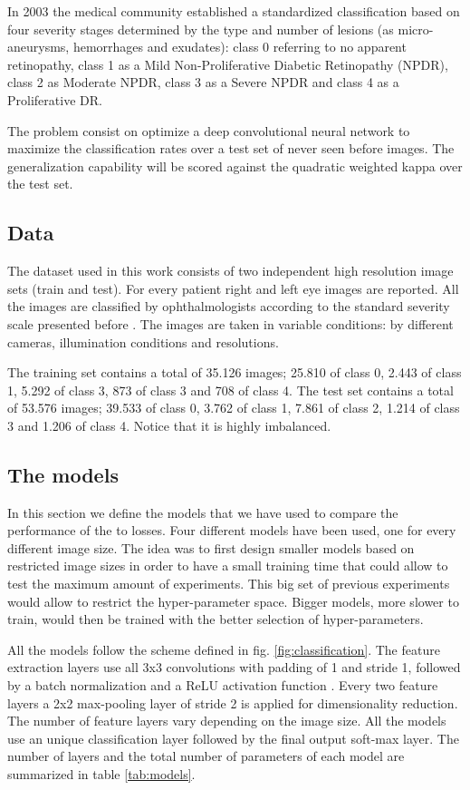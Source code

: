 \documentclass[times,twocolumn,final,authoryear]{elsarticle}
\begin{document}
In 2003 the medical community established a standardized classification based on four severity stages \cite{diaclass} determined by the type and number of lesions (as micro-aneurysms, hemorrhages and exudates): class 0 referring to no apparent retinopathy, class 1 as a Mild Non-Proliferative Diabetic Retinopathy (NPDR), class 2 as Moderate NPDR, class 3 as a Severe NPDR and class 4 as a Proliferative DR. 

The problem consist on optimize a deep convolutional neural network to maximize the classification rates over a test set of never seen before images. The generalization capability will be scored against the quadratic weighted kappa over the test set.

\subsection{Data}

The dataset used in this work consists of two independent high resolution image sets (train and test). For every patient right and left eye images are reported. All the images are classified by ophthalmologists according to the standard severity scale presented before \cite{diaclass}. The images are taken in variable conditions: by different cameras, illumination conditions and resolutions. 

The training set contains a total of 35.126 images; 25.810 of class 0, 2.443 of class 1, 5.292 of class 3, 873 of class 3 and 708 of class 4. The test set contains a total of 53.576 images; 39.533 of class 0, 3.762 of class 1, 7.861 of class 2, 1.214 of class 3 and 1.206 of class 4. Notice that it is highly imbalanced.

\subsection{The models}

In this section we define the models that we have used to compare the performance of the to losses. Four different models have been used, one for every different image size. The idea was to first design smaller models based on restricted image sizes in order to have a small training time that could allow to test the maximum amount of experiments. This big set of previous experiments would allow to restrict the hyper-parameter space. Bigger models, more slower to train, would then be trained with the better selection of hyper-parameters.

All the models follow the scheme defined in fig. \ref{fig:classification}. The feature extraction layers use all 3x3 convolutions with padding of 1 and stride 1, followed by a batch normalization\citep{batch-norm} and a ReLU activation function \citep{Dahl2013}. Every two feature layers a 2x2 max-pooling layer of stride 2 is applied for dimensionality reduction. The number of feature layers vary depending on the image size. All the models use an unique classification layer followed by the final output soft-max layer. The number of layers and the total number of parameters of each model are summarized in table \ref{tab:models}.
\end{document}

